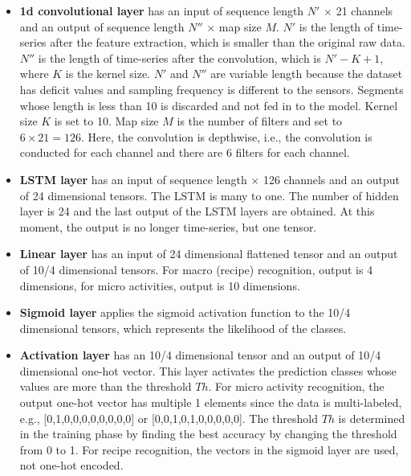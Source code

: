 \documentclass{svmult}
\begin{document}
\begin{itemize}
    \item {\bf 1d convolutional layer} has an input of sequence length $N'$ $\times$ 21 channels and an output of sequence length $N''$ $\times$ map size $M$. $N'$ is the length of time-series after the feature extraction, which is smaller than the original raw data. $N''$ is the length of time-series after the convolution, which is $N'-K+1$, where $K$ is the kernel size. $N'$ and $N''$ are variable length because the dataset has deficit values and sampling frequency is different to the sensors. Segments whose length is less than 10 is discarded and not fed in to the model. Kernel size $K$ is set to 10. Map size $M$ is the number of filters and set to $6 \times 21 =126$. Here, the convolution is depthwise, i.e., the convolution is conducted for each channel and there are 6 filters for each channel.  
    
    \item {\bf LSTM layer} has an input of sequence length $\times$ 126 channels and an output of 24 dimensional tensors. The LSTM is many to one. The number of hidden layer is 24 and the last output of the LSTM layers are obtained. At this moment, the output is no longer time-series, but one tensor.
    
    \item {\bf Linear layer} has an input of 24 dimensional flattened tensor and an output of 10/4 dimensional tensors. For macro (recipe) recognition, output is 4 dimensions, for micro activities, output is 10 dimensions.
    
    \item {\bf Sigmoid layer} applies the sigmoid activation function to the 10/4 dimensional tensors, which represents the likelihood of the classes.
    
    \item {\bf Activation layer} has an 10/4 dimensional tensor and an output of 10/4 dimensional one-hot vector. This layer activates the prediction classes whose values are more than the threshold $Th$. For micro activity recognition, the output one-hot vector has multiple 1 elements since the data is multi-labeled, e.g., [0,1,0,0,0,0,0,0,0,0] or [0,0,1,0,1,0,0,0,0,0]. The threshold $Th$ is determined in the training phase by finding the best accuracy by changing the threshold from 0 to 1. For recipe recognition, the vectors in the sigmoid layer are used, not one-hot encoded. 
\end{itemize}
\end{document}
